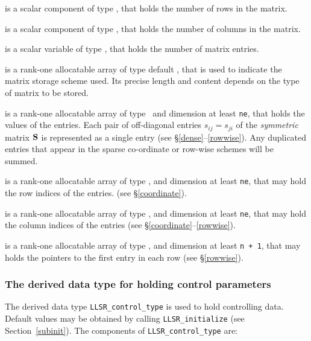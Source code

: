\documentclass{galahad}
\newcommand{\packagename}{LLSR}
\begin{document}
\begin{description}

 is a scalar component of type \integer,
that holds the number of rows in the matrix.

 is a scalar component of type \integer,
that holds the number of columns in the matrix.

 is a scalar variable of type \integer, that
holds the number of matrix entries.

 is a rank-one allocatable array of type default \character, that
is used to indicate the matrix storage scheme used. Its precise length and
content depends on the type of matrix to be stored.

 is a rank-one allocatable array of type \realdp\,
and dimension at least {\tt ne}, that holds the values of the entries.
Each pair of off-diagonal entries $s_{ij} = s_{ji}$ of the {\em symmetric}
matrix ${\mathbf{S}}$ is represented as a single entry
(see \S\ref{dense}--\ref{rowwise}).
Any duplicated entries that appear in the sparse
co-ordinate or row-wise schemes will be summed.

 is a rank-one allocatable array of type \integer,
and dimension at least {\tt ne}, that may hold the row indices of the entries.
(see \S\ref{coordinate}).

 is a rank-one allocatable array of type \integer,
and dimension at least {\tt ne}, that may hold the column indices of the entries
(see \S\ref{coordinate}--\ref{rowwise}).

 is a rank-one allocatable array of type \integer,
and dimension at least {\tt n + 1}, that may holds the pointers to
the first entry in each row (see \S\ref{rowwise}).

\end{description}


\subsubsection{The derived data type for holding control
 parameters}\label{typecontrol}
The derived data type
{\tt \packagename\_control\_type}
is used to hold controlling data. Default values may be obtained by calling
{\tt \packagename\_initialize}
(see Section~\ref{subinit}). The components of
{\tt \packagename\_control\_type}
are:
\end{document}

